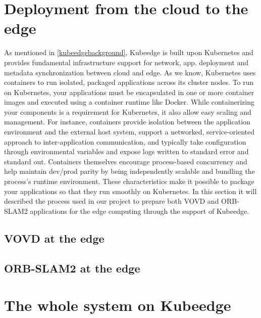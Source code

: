 \section{Deployment from the cloud to the edge} %
As mentioned in \ref{kubeedgebackground}, Kubeedge is built upon Kubernetes and provides fundamental infrastructure support for network, app. deployment and metadata synchronization between cloud and edge. As we know, Kubernetes uses containers to run isolated, packaged applications across its cluster nodes. To run on Kubernetes, your applications must be encapsulated in one or more container images and executed using a container runtime like Docker. While containerizing your components is a requirement for Kubernetes, it also allow easy scaling and management. For instance, containers provide isolation between the application environment and the external host system, support a networked, service-oriented approach to inter-application communication, and typically take configuration through environmental variables and expose logs written to standard error and standard out. Containers themselves encourage process-based concurrency and help maintain dev/prod parity by being independently scalable and bundling the process’s runtime environment. These characteristics make it possible to package your applications so that they run smoothly on Kubernetes. In this section it will described the process used in our project to prepare both VOVD and ORB-SLAM2 applications for the edge computing through the support of Kubeedge.


\subsection{VOVD at the edge}


\subsection{ORB-SLAM2 at the edge}

\section{The whole system on Kubeedge}



